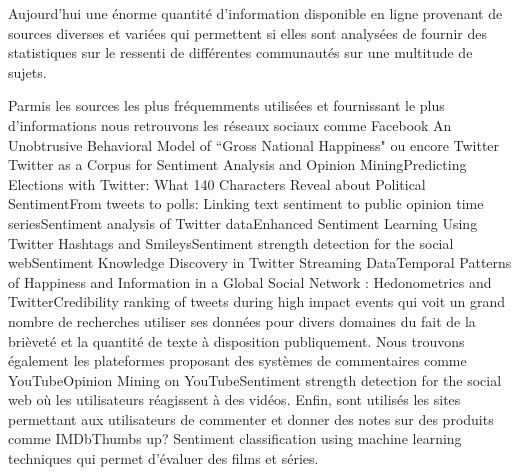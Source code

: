 \documentclass[8pt]{article}
\begin{document}
\begin{multicols}{2}
\par Aujourd'hui une énorme quantité d’information disponible en ligne provenant de sources diverses et variées qui permettent si elles sont analysées de fournir des statistiques sur le ressenti de différentes communautés sur une multitude de sujets.
\par Parmis les sources les plus fréquemments utilisées et fournissant le plus d’informations nous retrouvons les réseaux sociaux comme Facebook {An Unobtrusive Behavioral Model of “Gross National Happiness"} ou encore Twitter {Twitter as a Corpus for Sentiment Analysis and Opinion Mining}{Predicting Elections with Twitter: What 140 Characters Reveal about Political Sentiment}{From tweets to polls: Linking text sentiment to public opinion time series}{Sentiment analysis of Twitter data}{Enhanced Sentiment Learning Using Twitter Hashtags and Smileys}{Sentiment strength detection for the social web}{Sentiment Knowledge Discovery in Twitter Streaming Data}{Temporal Patterns of Happiness and Information in a Global Social Network : Hedonometrics and Twitter}{Credibility ranking of tweets during high impact events} qui voit un grand nombre de recherches utiliser ses données pour divers domaines du fait de la brièveté et la quantité de texte à disposition publiquement. Nous trouvons également les plateformes proposant des systèmes de commentaires comme YouTube{Opinion Mining on YouTube}{Sentiment strength detection for the social web} où les utilisateurs réagissent à des vidéos. Enfin, sont utilisés les sites permettant aux utilisateurs de commenter et donner des notes sur des produits comme IMDb{Thumbs up? Sentiment classification using machine learning techniques} qui permet d’évaluer des films et séries.



\end{multicols}
\end{document}
